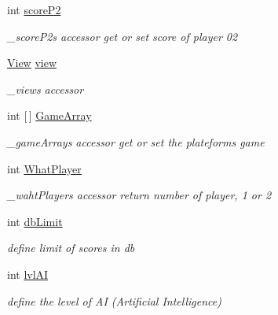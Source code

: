 \begin{DoxyCompactItemize}
int \hyperlink{class_morpion_1_1_model_a66ae61d511963f63b55cc6bb7d19a795}{score\+P2}
\begin{DoxyCompactList}\small\item\em \+\_\+score\+P2\textquotesingle{}s accessor get or set score of player 02 \end{DoxyCompactList}\item 
\hyperlink{class_morpion_1_1_view}{View} \hyperlink{class_morpion_1_1_model_a1a6035073f5bde0f41fc053451964eb1}{view}
\begin{DoxyCompactList}\small\item\em \+\_\+view\textquotesingle{}s accessor \end{DoxyCompactList}\item 
int \mbox{[}$\,$\mbox{]} \hyperlink{class_morpion_1_1_model_a565b0372c7f7833b244c03721f7eebd6}{Game\+Array}
\begin{DoxyCompactList}\small\item\em \+\_\+game\+Array\textquotesingle{}s accessor get or set the plateform\textquotesingle{}s game \end{DoxyCompactList}\item 
int \hyperlink{class_morpion_1_1_model_a56f84098c9bde669925d9a6850aaf061}{What\+Player}
\begin{DoxyCompactList}\small\item\em \+\_\+waht\+Player\textquotesingle{}s accessor return number of player, 1 or 2 \end{DoxyCompactList}\item 
int \hyperlink{class_morpion_1_1_model_ae443f2333536e0ec65b288d05c9d4cbc}{db\+Limit}
\begin{DoxyCompactList}\small\item\em define limit of scores in db \end{DoxyCompactList}\item 
int \hyperlink{class_morpion_1_1_model_a6b6c2e61ebdbf93aa74d1348afbd9e12}{lvl\+AI}
\begin{DoxyCompactList}\small\item\em define the level of AI (Artificial Intelligence) \end{DoxyCompactList}\end{DoxyCompactItemize}


